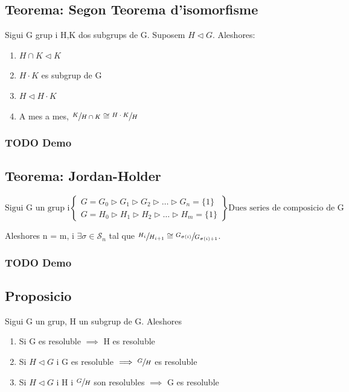 \documentclass[11pt]{article}
\begin{document}
\subsection{Teorema: Segon Teorema d'isomorfisme}
\label{sec:org7a8958a}
Sigui G grup i H,K dos subgrups de G. Suposem \(H \vartriangleleft G\). Aleshores:
\begin{enumerate}
\item \(H \cap K \vartriangleleft K\)
\item \(H \cdot K\) es subgrup de G
\item \(H \vartriangleleft H \cdot K\)
\item A mes a mes, \(\sfrac{K}{H \cap K} \cong \sfrac{H \cdot K}{H}\)
\end{enumerate}

\subsubsection{{\bfseries\sffamily TODO} Demo}
\label{sec:org52a13a8}

\subsection{Teorema: Jordan-Holder}
\label{sec:org6b32ed4}
\begin{displaymath}
    \text{Sigui G un grup i}
               \left\{\begin{array}{ll}
G = G_0 \vartriangleright G_1 \vartriangleright G_2 \vartriangleright \ldots \vartriangleright G_n = \{1\} \\
G = H_0 \vartriangleright H_1 \vartriangleright H_2 \vartriangleright \ldots \vartriangleright H_m = \{1\}
                \end{array}
\right\rbrace
              \text{Dues series de composicio de G}
\end{displaymath}

Aleshores n = m, i \(\exists \sigma \in \mathcal{S}_n\) tal que \(\sfrac{H_i}{H_{i+1}} \cong \sfrac{G_{\sigma(i)}}{G_{\sigma(i)+1}}\).

\subsubsection{{\bfseries\sffamily TODO} Demo}
\label{sec:org27b91bc}

\subsection{Proposicio}
\label{sec:org645637d}
Sigui G un grup, H un subgrup de G. Aleshores
\begin{enumerate}
\item Si G es resoluble \(\implies\) H es resoluble
\item Si \(H \vartriangleleft G\) i G es resoluble \(\implies \sfrac{G}{H}\) es resoluble
\item Si \(H \vartriangleleft G\) i H i \(\sfrac{G}{H}\) son resolubles \(\implies\) G es resoluble
\end{enumerate}
\end{document}
